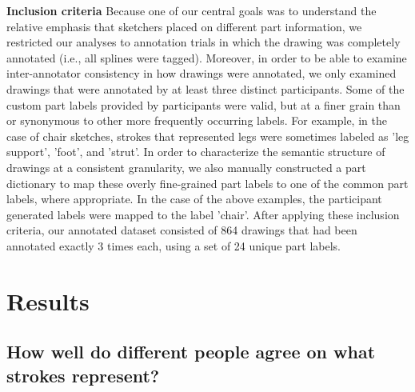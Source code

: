 \documentclass[10pt,letterpaper]{article}
\begin{document}
\noindent \textbf{Inclusion criteria} \hspace{3mm} Because one of our central goals was to understand the relative emphasis that sketchers placed on different part information, we restricted our analyses to annotation trials in which the drawing was completely annotated (i.e., all splines were tagged). 
Moreover, in order to be able to examine inter-annotator consistency in how drawings were annotated, we only examined drawings that were annotated by at least three distinct participants. 
Some of the custom part labels provided by participants were valid, but at a finer grain than or synonymous to other more frequently occurring labels. 
For example, in the case of chair sketches, strokes that represented legs were sometimes labeled as 'leg support', 'foot', and 'strut'. 
In order to characterize the semantic structure of drawings at a consistent granularity, we also manually constructed a part dictionary to map these overly fine-grained part labels to one of the common part labels, where appropriate. 
In the case of the above examples, the participant generated labels were mapped to the label 'chair'.
After applying these inclusion criteria, our annotated dataset consisted of 864 drawings that had been annotated exactly 3 times each, using a set of 24 unique part labels. 


\section{Results}

\subsection{How well do different people agree on what strokes represent?}
\end{document}
